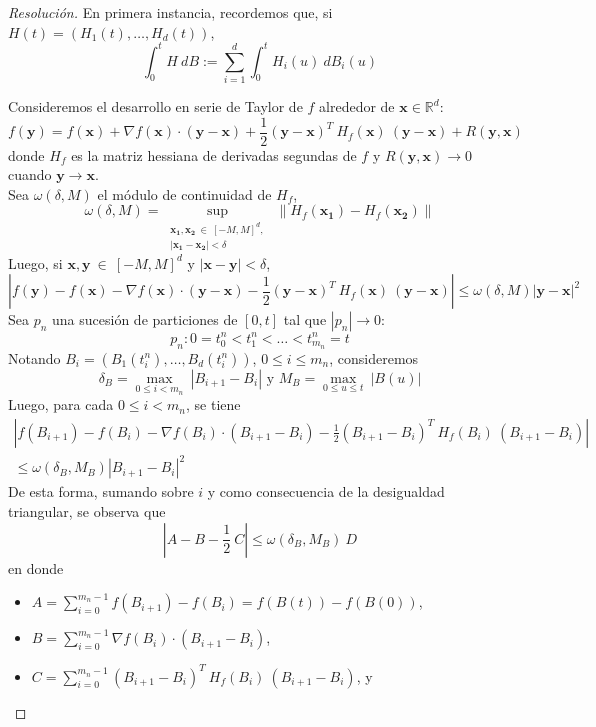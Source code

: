 \documentclass[a4paper,11pt]{article}
\newcommand{\abs}[1]{\ensuremath{\left\lvert #1 \right\rvert}}
\newcommand{\norm}[1]{\left\lVert#1\right\rVert}
\newcommand{\Real}{\mathbb{R}}
\newcommand{\Grad}[1]{\nabla #1}
\newcommand{\Dif}[1]{d #1}
\newcommand{\IntB}[1]{\int_0^t{#1~\Dif{B}}}
\newcommand{\IntBiu}[1]{\int_0^t{#1~\Dif{B_i(u)}}}
\newcommand{\vx}[1]{\mathbf{#1}}
\begin{document}
\begin{proof}[Resoluci\'on]
En primera instancia, recordemos que, si $H(t) = \left(H_1(t),\dots,H_d(t)\right)$,
$$\IntB{H} := \sum_{i = 1}^{d}{\IntBiu{H_i(u)}}$$

Consideremos el desarrollo en serie de Taylor de $f$ alrededor de $\vx{x} \in \Real^d$:
$$f(\vx{y}) = f(\vx{x}) + \Grad{f(\vx{x})} \cdot (\vx{y} - \vx{x})
    + \frac{1}{2} (\vx{y} - \vx{x})^T ~ H_f(\vx{x}) ~ (\vx{y} - \vx{x}) 
    + R(\vx{y}, \vx{x})$$
donde $H_f$ es la matriz hessiana de derivadas segundas de $f$ y $R(\vx{y}, \vx{x}) \to 0$ cuando $\vx{y} \to \vx{x}$.\\

Sea $\omega(\delta, M)$ el módulo de continuidad de $H_f$,
$$\omega(\delta, M) = \underset{\substack{\vx{x_1}, \vx{x_2} ~ \in ~ [-M,M]^d, \\ \abs{\vx{x_1} - \vx{x_2}} < \delta}}
    {\sup} ~ \norm{H_f(\vx{x_1}) - H_f(\vx{x_2})}$$
Luego, si $\vx{x}, \vx{y} ~ \in ~ [-M,M]^d$ y $\abs{\vx{x} - \vx{y}} < \delta$,
$$\abs{f(\vx{y}) - f(\vx{x}) - \Grad{f(\vx{x})} \cdot (\vx{y} - \vx{x}) -\frac{1}{2} (\vx{y} - \vx{x})^T ~ H_f(\vx{x}) ~ (\vx{y} - \vx{x})}
    \leq \omega(\delta, M) \abs{\vx{y} - \vx{x}}^2$$
Sea $p_n$ una sucesión de particiones de $[0,t]$ tal que $\abs{p_n} \to 0$:
$$p_n : 0 = t_0^n < t_1^n < \dots < t_{m_n}^n = t$$
Notando $B_i = (B_1(t_i^n), \dots, B_d(t_i^n))$, $0 \leq i \leq m_n$, consideremos
$$\delta_B = \underset{0 \leq i < m_n}{\max} ~ \abs{B_{i+1} - B_i}
\textrm{ y }
M_B = \underset{0 \leq u \leq t}{\max} ~ \abs{B(u)}$$
Luego, para cada $0 \leq i < m_n$, se tiene
\begin{multline*}
    \abs{f(B_{i+1}) - f(B_i) - \Grad{f(B_i)} \cdot (B_{i+1} - B_i) -\frac{1}{2} (B_{i+1} - B_i)^T ~ H_f(B_i) ~ (B_{i+1} - B_i)} \\
    \leq \omega(\delta_B, M_B) \abs{B_{i+1} - B_i}^2
\end{multline*}
De esta forma, sumando sobre $i$ y como consecuencia de la desigualdad triangular, se observa que
$$\abs{A - B - \frac{1}{2} ~C} \leq \omega(\delta_B, M_B) ~ D$$
en donde
\begin{itemize}
    \item $A = \displaystyle \sum_{i = 0}^{m_n - 1}{f(B_{i+1}) - f(B_i)} = f(B(t)) - f(B(0))$,

    \item $B = \displaystyle \sum_{i = 0}^{m_n - 1}{\Grad{f(B_i)} \cdot (B_{i+1} - B_i)}$,

    \item $C = \displaystyle \sum_{i = 0}^{m_n - 1}{(B_{i+1} - B_i)^T ~ H_f(B_i) ~ (B_{i+1} - B_i)}$, y


\end{itemize}
\end{proof}
\end{document}
